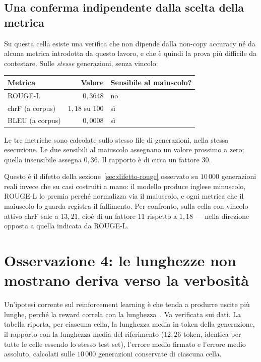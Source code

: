 \subsection{Una conferma indipendente dalla scelta della metrica}
\label{sec:conferma-case-sensitive}

Su questa cella esiste una verifica che non dipende dalla non-copy accuracy né
da alcuna metrica introdotta da questo lavoro, e che è quindi la prova più
difficile da contestare. Sulle \emph{stesse} generazioni, senza vincolo:

\begin{center}
\begin{tabular}{lrl}
\toprule
Metrica & Valore & Sensibile al maiuscolo? \\
\midrule
ROUGE-L & $0{,}3648$ & no \\
chrF (a corpus) & $1{,}18$ su $100$ & sì \\
BLEU (a corpus) & $0{,}0008$ & sì \\
\bottomrule
\end{tabular}
\end{center}

Le tre metriche sono calcolate sullo stesso file di generazioni, nella stessa
esecuzione. Le due sensibili al maiuscolo assegnano un valore prossimo a zero;
quella insensibile assegna $0{,}36$. Il rapporto è di circa un fattore $30$.

Questo è il difetto della sezione~\ref{sec:difetto-rouge} osservato su
$10\,000$ generazioni reali invece che su casi costruiti a mano: il modello
produce inglese minuscolo, ROUGE-L lo premia perché normalizza via il maiuscolo,
e ogni metrica che il maiuscolo lo guarda registra il fallimento. Per confronto,
sulla cella con vincolo attivo chrF sale a $13{,}21$, cioè di un fattore $11$
rispetto a $1{,}18$ --- nella direzione opposta a quella indicata da ROUGE-L.

\section{Osservazione 4: le lunghezze non mostrano deriva verso la verbosità}

Un'ipotesi corrente sul reinforcement learning è che tenda a produrre uscite più
lunghe, perché la reward correla con la lunghezza~\cite{singhal2023length}. Va
verificata sui dati. La tabella riporta, per ciascuna cella, la lunghezza media
in token della generazione, il rapporto con la lunghezza media del riferimento
($12{,}26$ token, identica per tutte le celle essendo lo stesso test set),
l'errore medio firmato e l'errore medio assoluto, calcolati sulle $10\,000$
generazioni conservate di ciascuna cella.

